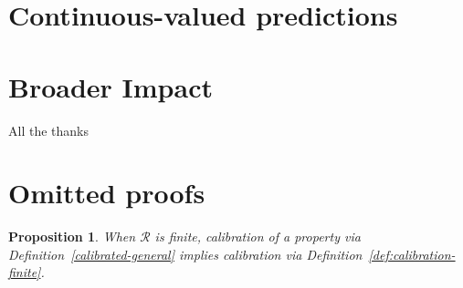 \documentclass{article}
\newcommand{\R}{\mathcal{R}}
\newtheorem{proposition}{Proposition}
\begin{document}
\section{Continuous-valued predictions}\label{sec:contin-consis}



\newpage

\section*{Broader Impact}

\begin{ack}
All the thanks
\end{ack}




\newpage
\appendix
\section{Omitted proofs}
\begin{proposition}
	When $\R$ is finite, calibration of a property via Definition~\ref{calibrated-general} implies calibration via Definition~\ref{def:calibration-finite}.
\end{proposition}
\end{document}
